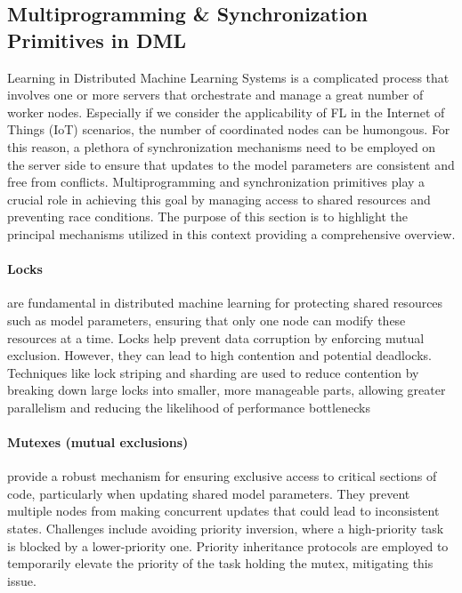 \subsection{Multiprogramming \& Synchronization Primitives in DML}
Learning in Distributed Machine Learning Systems is a complicated process that involves one or more servers that orchestrate
and manage a great number of worker nodes. Especially if we consider the applicability of FL in the Internet of Things (IoT)
scenarios, the number of coordinated nodes can be humongous. For this reason, a plethora of synchronization mechanisms
need to be employed on the server side to ensure that updates to the model parameters are consistent and free from conflicts.
Multiprogramming and synchronization primitives play a crucial role in achieving this goal by managing access to shared resources and preventing race conditions. The purpose of this section is to highlight the principal mechanisms utilized in this context providing
a comprehensive overview.

\paragraph{Locks}
are fundamental in distributed machine learning for protecting shared resources such as model parameters, ensuring that only
one node can modify these resources at a time. Locks help prevent data corruption by enforcing mutual exclusion. However, they can
lead to high contention and potential deadlocks. Techniques like lock striping and sharding are used to reduce contention by breaking
down large locks into smaller, more manageable parts, allowing greater parallelism and reducing the likelihood of performance bottlenecks

\paragraph{Mutexes (mutual exclusions)}
provide a robust mechanism for ensuring exclusive access to critical sections of code, particularly when updating shared model parameters. 
They prevent multiple nodes from making concurrent updates that could lead to inconsistent states. Challenges include avoiding priority 
inversion, where a high-priority task is blocked by a lower-priority one. Priority inheritance protocols are employed to temporarily elevate 
the priority of the task holding the mutex, mitigating this issue.

